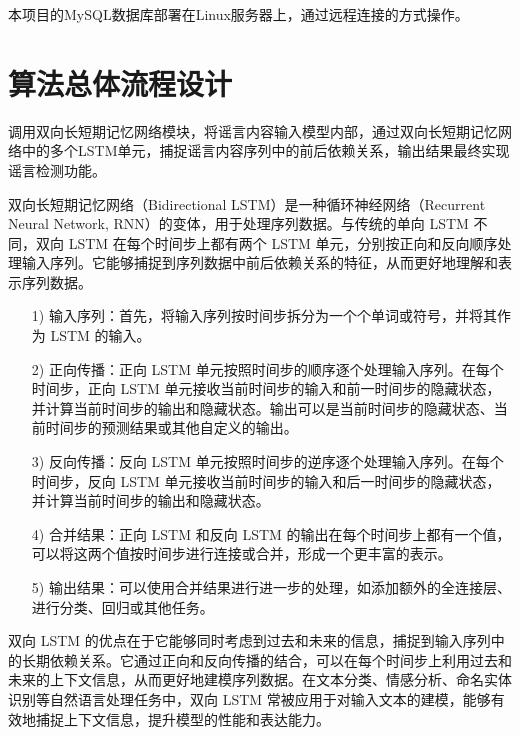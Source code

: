 \documentclass{article}
\begin{document}
本项目的MySQL数据库部署在Linux服务器上，通过远程连接的方式操作。

\newpage

\section{算法总体流程设计}
调用双向长短期记忆网络模块，将谣言内容输入模型内部，通过双向长短期记忆网络中的多个LSTM单元，捕捉谣言内容序列中的前后依赖关系，输出结果最终实现谣言检测功能。

双向长短期记忆网络（Bidirectional LSTM）是一种循环神经网络（Recurrent Neural Network, RNN）的变体，用于处理序列数据。与传统的单向 LSTM 不同，双向 LSTM 在每个时间步上都有两个 LSTM 单元，分别按正向和反向顺序处理输入序列。它能够捕捉到序列数据中前后依赖关系的特征，从而更好地理解和表示序列数据。

\begin{itemize}
  \item [1)]
  输入序列：首先，将输入序列按时间步拆分为一个个单词或符号，并将其作为 LSTM 的输入。
  \item [2)]
  正向传播：正向 LSTM 单元按照时间步的顺序逐个处理输入序列。在每个时间步，正向 LSTM 单元接收当前时间步的输入和前一时间步的隐藏状态，并计算当前时间步的输出和隐藏状态。输出可以是当前时间步的隐藏状态、当前时间步的预测结果或其他自定义的输出。
  \item [3)]
  反向传播：反向 LSTM 单元按照时间步的逆序逐个处理输入序列。在每个时间步，反向 LSTM 单元接收当前时间步的输入和后一时间步的隐藏状态，并计算当前时间步的输出和隐藏状态。
  \item [4)]
  合并结果：正向 LSTM 和反向 LSTM 的输出在每个时间步上都有一个值，可以将这两个值按时间步进行连接或合并，形成一个更丰富的表示。
  \item [5)]
  输出结果：可以使用合并结果进行进一步的处理，如添加额外的全连接层、进行分类、回归或其他任务。
\end{itemize}

双向 LSTM 的优点在于它能够同时考虑到过去和未来的信息，捕捉到输入序列中的长期依赖关系。它通过正向和反向传播的结合，可以在每个时间步上利用过去和未来的上下文信息，从而更好地建模序列数据。在文本分类、情感分析、命名实体识别等自然语言处理任务中，双向 LSTM 常被应用于对输入文本的建模，能够有效地捕捉上下文信息，提升模型的性能和表达能力。

\newpage
\end{document}
